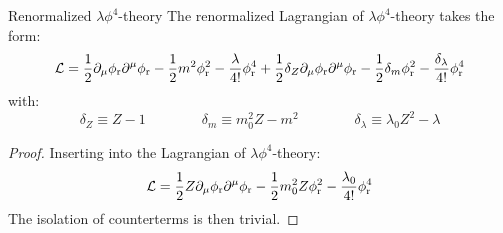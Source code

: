 \begin{proposition}{Renormalized $ \lambda \phi^4 $-theory}{}
  The renormalized Lagrangian of $ \lambda \phi^4 $-theory takes the form:
  \begin{equation}
    \mathcal{L} = \frac{1}{2} \partial_\mu \phi_\text{r} \partial^\mu \phi_\text{r} - \frac{1}{2} m^2 \phi_\text{r}^2 - \frac{\lambda}{4!} \phi_\text{r}^4 + \frac{1}{2} \delta_Z \partial_\mu \phi_\text{r} \partial^\mu \phi_\text{r} - \frac{1}{2} \delta_m \phi_\text{r}^2 - \frac{\delta_\lambda}{4!} \phi_\text{r}^4
  \end{equation}
  with:
  \begin{equation}
    \delta_Z \equiv Z - 1
    \qquad \qquad
    \delta_m \equiv m_0^2 Z - m^2
    \qquad \qquad
    \delta_\lambda \equiv \lambda_0 Z^2 - \lambda
  \end{equation}
\end{proposition}

\begin{proofbox}
  \begin{proof}
    Inserting  into the Lagrangian of $ \lambda \phi^4 $-theory:
    \begin{equation*}
      \mathcal{L} = \frac{1}{2} Z \partial_\mu \phi_\text{r} \partial^\mu \phi_\text{r} - \frac{1}{2} m_0^2 Z \phi_\text{r}^2 - \frac{\lambda_0}{4!} \phi_\text{r}^4
    \end{equation*}
    The isolation of counterterms is then trivial.
  \end{proof}
\end{proofbox}


